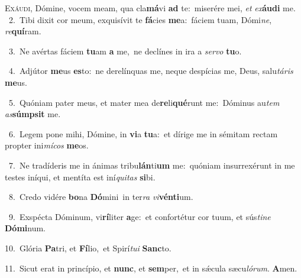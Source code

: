 \lettrine{\initial\textcolor{\initialcolor}{E}}{xáudi,} Dómine, vocem meam, qua cla\-\textbf{má}\-vi \textbf{ad} te:~\star miserére mei, \textit{et} \textit{ex}\-\textbf{áu}\textbf{di} me.\\
{\numbfont\textcolor{\numbcolor}{~2.}}~Tibi dixit cor meum, exquisívit te \textbf{fá}\-cies \textbf{me}\-a:~\star fáciem tuam, Dómi\-\textit{ne}\-, \textit{re}\-\textbf{quí}ram.\par
{\numbfont\textcolor{\numbcolor}{~3.}}~Ne avértas fáciem \textbf{tu}\-am \textbf{a} me,~\star ne declínes in ira a \textit{ser}\-\textit{vo} \textbf{tu}\-o.\par
{\numbfont\textcolor{\numbcolor}{~4.}}~Adjútor \textbf{me}\-us \textbf{es}\-to:~\star ne derelínquas me, neque despícias me, Deus, salu\-\textit{tá}\-\textit{ris} \textbf{me}\-us.\par
{\numbfont\textcolor{\numbcolor}{~5.}}~Quóniam pater meus, et mater mea de\-\textbf{re}\-li\-\textbf{qué}\-runt me:~\star Dóminus au\textit{tem} \textit{as}\-\textbf{súmp}\textbf{sit} me.\par
{\numbfont\textcolor{\numbcolor}{~6.}}~Legem pone mihi, Dómine, in \textbf{vi}\-a \textbf{tu}\-a:~\star et dírige me in sémitam rectam propter ini\-\textit{mí}\-\textit{cos} \textbf{me}\-os.\par
{\numbfont\textcolor{\numbcolor}{~7.}}~Ne tradíderis me in ánimas tribu\-\textbf{lán}\-ti\textbf{um} me:~\star quóniam insurrexérunt in me testes iníqui, et mentíta est iní\-\textit{qui}\-\textit{tas} \textbf{si}\-bi.\par
{\numbfont\textcolor{\numbcolor}{~8.}}~Credo vidére \textbf{bo}\-na \textbf{Dó}\-mini~\star in ter\textit{ra} \textit{vi}\-\textbf{vén}\textbf{ti}um.\par
{\numbfont\textcolor{\numbcolor}{~9.}}~Exspécta Dóminum, vi\-\textbf{rí}\-liter \textbf{a}\-ge:~\star et confortétur cor tuum, et sús\-\textit{ti}\-\textit{ne} \textbf{Dó}\-\textbf{mi}num.\par
{\numbfont\textcolor{\numbcolor}{10.}}~Glória \textbf{Pa}\-tri, et \textbf{Fí}\-lio,~\star et Spirí\-\textit{tu}\-\textit{i} \textbf{Sanc}\-to.\par
{\numbfont\textcolor{\numbcolor}{11.}}~Sicut erat in princípio, et \textbf{nunc}\-, et \textbf{sem}\-per,~\star et in sǽcula sæcu\-\textit{ló}\-\textit{rum}. \textbf{A}\-men.\par
